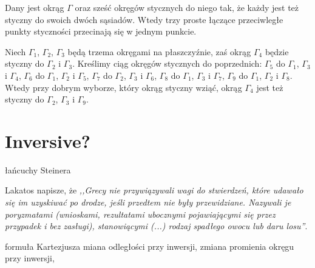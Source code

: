 \begin{proposition}
%
	Dany jest okrąg $\Gamma$ oraz sześć okręgów stycznych do niego tak, że każdy jest też styczny do swoich dwóch sąsiadów.
	Wtedy trzy proste łączące przeciwległe punkty styczności przecinają się w jednym punkcie.
\end{proposition}

\begin{proposition}
%
	Niech $\Gamma_1$, $\Gamma_2$, $\Gamma_3$ będą trzema okręgami na płaszczyźnie, zaś okrąg $\Gamma_4$ będzie styczny do $\Gamma_2$ i $\Gamma_3$.
	Kreślimy ciąg okręgów stycznych do poprzednich:
	$\Gamma_5$ do $\Gamma_1$, $\Gamma_3$ i $\Gamma_4$,
	$\Gamma_6$ do $\Gamma_1$, $\Gamma_2$ i $\Gamma_5$,
	$\Gamma_7$ do $\Gamma_2$, $\Gamma_3$ i $\Gamma_6$,
	$\Gamma_8$ do $\Gamma_1$, $\Gamma_3$ i $\Gamma_7$,
	$\Gamma_9$ do $\Gamma_1$, $\Gamma_2$ i $\Gamma_8$.
	Wtedy przy dobrym wyborze, który okrąg styczny wziąć, okrąg $\Gamma_4$ jest też styczny do $\Gamma_2$, $\Gamma_3$ i $\Gamma_9$.
\end{proposition}

\section{Inversive?}
łańcuchy Steinera %

Lakatos napisze, że \emph{,,Grecy nie przywiązywali wagi do stwierdzeń, które udawało się im uzyskiwać po drodze, jeśli przedtem nie były przewidziane.
Nazywali je poryzmatami (wnioskami, rezultatami ubocznymi pojawiającymi się przez przypadek i bez zasługi), stanowiącymi (...) rodzaj spadłego owocu lub daru losu''}. %


formuła Kartezjusza %
miana odległości przy inwersji, zmiana promienia okręgu przy inwersji, %

